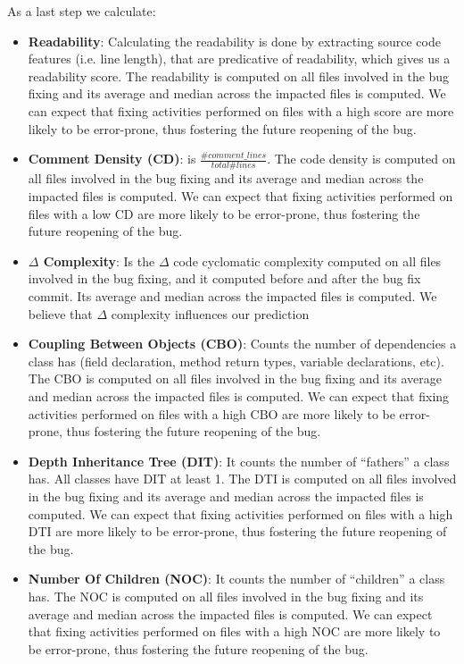 \documentclass[sigconf,review]{acmart}
\begin{document}
As a last step we calculate: 
\begin{itemize}
\item \textbf{Readability}: Calculating the readability is done by extracting source code features (i.e. line length), that are predicative of readability, which gives us a readability score. The readability is computed on all files involved in the bug fixing and its average and median across the impacted files is computed. We can expect that fixing activities performed on files with a high score are more likely to be error-prone, thus fostering the future reopening of the bug.

\item{\textbf{Comment Density (CD)}: is $\frac{\# comment\_lines}{total \# lines}$. The code density is computed on all files involved in the bug fixing and its average and median across the impacted files is computed. We can expect that fixing activities performed on files with a low CD are more likely to be error-prone, thus fostering the future reopening of the bug.
}

\item{\textbf{$\Delta$ Complexity}: Is the $\Delta$ code cyclomatic complexity computed on all files involved in the bug fixing, and it computed before and after the bug fix commit. Its average and median across the impacted files is computed. We believe that $\Delta$ complexity influences our prediction
}
\item{\textbf{Coupling Between Objects (CBO)}: Counts the number of dependencies a class has (field declaration, method return types, variable declarations, etc). The CBO is computed on all files involved in the bug fixing and its average and median across the impacted files is computed. We can expect that fixing activities performed on files with a high CBO are more likely to be error-prone, thus fostering the future reopening of the bug.
}

\item{\textbf{Depth Inheritance Tree (DIT)}: It counts the number of ``fathers'' a class has. All classes have DIT at least 1. The DTI is computed on all files involved in the bug fixing and its average and median across the impacted files is computed. We can expect that fixing activities performed on files with a high DTI are more likely to be error-prone, thus fostering the future reopening of the bug.
}

\item{\textbf{Number Of Children (NOC)}: It counts the number of ``children'' a class has. The NOC is computed on all files involved in the bug fixing and its average and median across the impacted files is computed. We can expect that fixing activities performed on files with a high NOC are more likely to be error-prone, thus fostering the future reopening of the bug.
}


\end{itemize}
\end{document}
